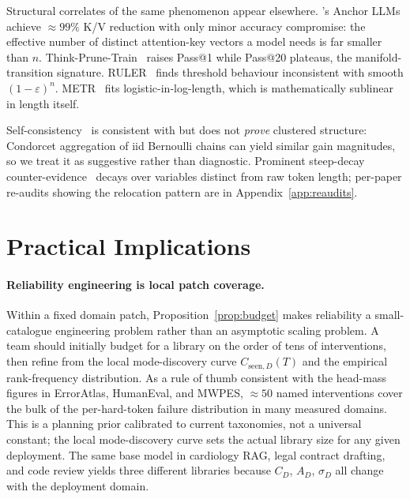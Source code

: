 \documentclass{article}
\theoremstyle{taeplain}
\theoremstyle{taedefn}
\newcommand{\teApprox}{\ensuremath{\approx}}
\begin{document}
Structural correlates of the same phenomenon appear elsewhere. \citet{pang2024anchor}'s Anchor LLMs achieve $\teApprox 99\%$ K/V reduction with only minor accuracy compromise: the effective number of distinct attention-key vectors a model needs is far smaller than $n$. Think-Prune-Train~\citep{costello2025think} raises Pass@1 while Pass@20 plateaus, the manifold-transition signature. RULER~\citep{hsieh2024ruler} finds threshold behaviour inconsistent with smooth $(1-\varepsilon)^n$. METR~\citep{kwa2025horizon} fits logistic-in-log-length, which is mathematically sublinear in length itself.

Self-consistency~\citep{wangx2023selfconsistency} is consistent with but does not \emph{prove} clustered structure: Condorcet aggregation of iid Bernoulli chains can yield similar gain magnitudes, so we treat it as suggestive rather than diagnostic. Prominent steep-decay counter-evidence~\citep{dziri2023faith,kuratov2024babilong,wan2026fano,karpinska2024nocha} decays over variables distinct from raw token length; per-paper re-audits showing the relocation pattern are in Appendix~\ref{app:reaudits}.

\section{Practical Implications}
\label{sec:implications}

\paragraph{Reliability engineering is local patch coverage.}
Within a fixed domain patch, Proposition~\ref{prop:budget} makes reliability a small-catalogue engineering problem rather than an asymptotic scaling problem. A team should initially budget for a library on the order of tens of interventions, then refine from the local mode-discovery curve $C_{\text{seen},D}(T)$ and the empirical rank-frequency distribution. As a rule of thumb consistent with the head-mass figures in ErrorAtlas, HumanEval, and MWPES, $\teApprox 50$ named interventions cover the bulk of the per-hard-token failure distribution in many measured domains. This is a planning prior calibrated to current taxonomies, not a universal constant; the local mode-discovery curve sets the actual library size for any given deployment. The same base model in cardiology RAG, legal contract drafting, and code review yields three different libraries because $C_D$, $A_D$, $\sigma_D$ all change with the deployment domain.
\end{document}
